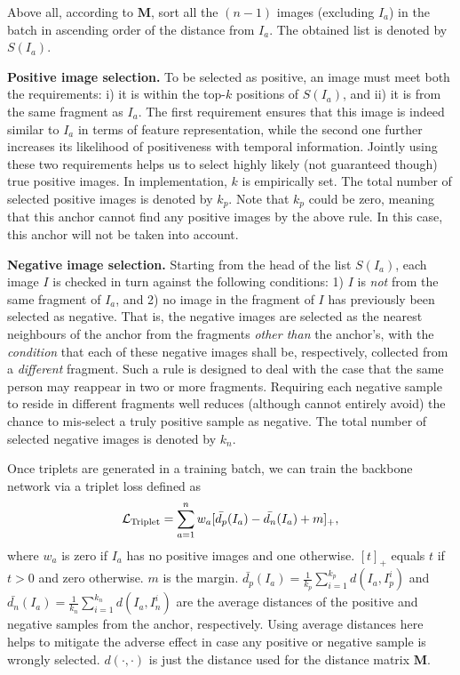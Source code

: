 \documentclass[10pt,twocolumn,letterpaper]{article}
\begin{document}
Above all, according to ${\mathbf M}$, sort all the $(n-1)$ images (excluding $I_{a}$) in the batch in ascending order of the distance from $I_{a}$. The obtained list is denoted by $S(I_{a})$.

\textbf{Positive image selection.} To be selected as positive, an image must meet both the requirements: i) it is within the top-$k$ positions of $S(I_{a})$, {and} ii) it is from the same fragment as $I_{a}$. The first requirement ensures that this image is indeed similar to $I_{a}$ in terms of feature representation, while the second one further increases its likelihood of positiveness with temporal information. Jointly using these two requirements helps us to select highly likely (not guaranteed though) true positive images. In implementation, $k$ is empirically set. The total number of selected positive images is denoted by $k_p$. Note that $k_p$ could be zero, meaning that this anchor cannot find any positive images by the above rule. In this case, this anchor will not be taken into account. 
 
 
 


 
\textbf{Negative image selection.} Starting from the head of the list $S(I_{a})$, each image $I$ is checked in turn against the following conditions: 1) $I$ is \textit{not} from the same fragment of $I_{a}$, and 2) no image in the fragment of $I$ has previously been selected as negative. That is, the negative images are selected as the nearest neighbours of the anchor from the fragments \textit{other than} the anchor's, with the \textit{condition} that each of these negative images shall be, respectively, collected from a \textit{different} fragment. Such a rule is designed to deal with the case that the same person may reappear in two or more fragments. Requiring each negative sample to reside in different fragments well reduces (although cannot entirely avoid) the chance to mis-select a truly positive sample as negative. The total number of selected negative images is denoted by $k_n$. 
 
Once triplets are generated in a training batch, we can train the backbone network via a triplet loss defined as
\begin{equation}\label{eq02}
\begin{aligned}
\mathcal{L}_{\mathrm{Triplet}}=\sum_{a=1}^{n} w_{a}[\bar{d_{p}}(I_{a})-\bar{d_{n}}(I_{a}) +m]_{+},
 \end{aligned}
 \vspace*{-1pt}
\end{equation}where $w_a$ is zero if $I_a$ has no positive images and one otherwise.
$[t]_{+}$ equals $t$ if $t > 0$ and zero otherwise. $m$ is the margin. $\bar{d_{p}}(I_{a})=\frac{1}{k_{p}} \sum_{i=1}^{k_{p}}d(I_{a},I_{p}^{i})$ and $\bar{d_{n}}(I_{a})=\frac{1}{k_{n}} \sum_{i=1}^{k_{n}}d(I_{a},I_{n}^{i})$ are the average distances of the positive and negative samples from the anchor, respectively. Using average distances here helps to mitigate the adverse effect in case any positive or negative sample is wrongly selected. $d(\cdot,\cdot)$ is just the distance used for the distance matrix ${\mathbf M}$.
\end{document}
